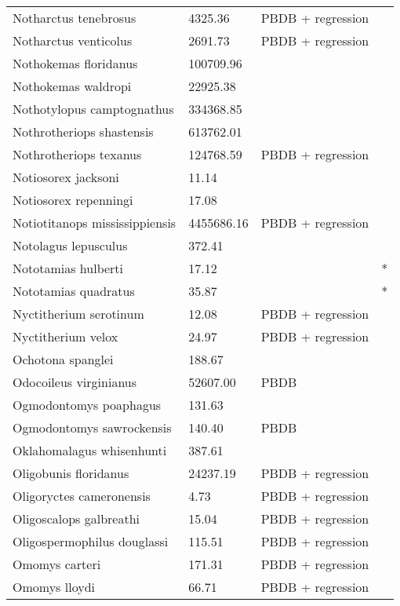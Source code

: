 \documentclass{article}
\begin{document}
\begin{center}
\begin{longtable}{p{} p{} p{} p{}}
    Notharctus tenebrosus & 4325.36 & PBDB + regression &  \\ 
    Notharctus venticolus & 2691.73 & PBDB + regression &  \\ 
    Nothokemas floridanus & 100709.96 & \cite{Tomiya2013} &  \\ 
    Nothokemas waldropi & 22925.38 & \cite{Tomiya2013} &  \\ 
    Nothotylopus camptognathus & 334368.85 & \cite{Tomiya2013} &  \\ 
    Nothrotheriops shastensis & 613762.01 & \cite{Brook2004a} &  \\ 
    Nothrotheriops texanus & 124768.59 & PBDB + regression &  \\ 
    Notiosorex jacksoni & 11.14 & \cite{Madden1985} &  \\ 
    Notiosorex repenningi & 17.08 & \cite{Lillegraven1977} &  \\ 
    Notiotitanops mississippiensis & 4455686.16 & PBDB + regression &  \\ 
    Notolagus lepusculus & 372.41 & \cite{Tomiya2013} &  \\ 
    Nototamias hulberti & 17.12 & \cite{Tomiya2013} & * \\ 
    Nototamias quadratus & 35.87 & \cite{Tomiya2013} & * \\ 
    Nyctitherium serotinum & 12.08 & PBDB + regression &  \\ 
    Nyctitherium velox & 24.97 & PBDB + regression &  \\ 
    Ochotona spanglei & 188.67 & \cite{Tomiya2013} &  \\ 
    Odocoileus virginianus & 52607.00 & PBDB &  \\ 
    Ogmodontomys poaphagus & 131.63 & \cite{Tomiya2013} &  \\ 
    Ogmodontomys sawrockensis & 140.40 & PBDB &  \\ 
    Oklahomalagus whisenhunti & 387.61 & \cite{Tomiya2013} &  \\ 
    Oligobunis floridanus & 24237.19 & PBDB + regression &  \\ 
    Oligoryctes cameronensis & 4.73 & PBDB + regression &  \\ 
    Oligoscalops galbreathi & 15.04 & PBDB + regression &  \\ 
    Oligospermophilus douglassi & 115.51 & PBDB + regression &  \\ 
    Omomys carteri & 171.31 & PBDB + regression &  \\ 
    Omomys lloydi & 66.71 & PBDB + regression &  \\ 

\end{longtable}
\end{center}
\end{document}
